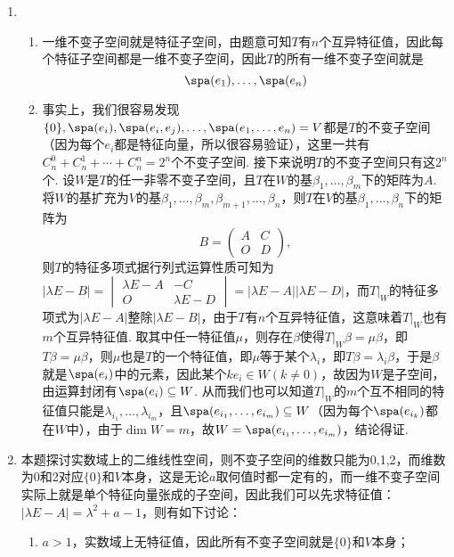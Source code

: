 \begin{enumerate}
    \item \begin{enumerate}
              \item 一维不变子空间就是特征子空间，由题意可知$T$有$n$个互异特征值，因此每个特征子空间都是一维不变子空间，因此$T$的所有一维不变子空间就是
                    \[\spa(e_1),\ldots,\spa(e_n)\]

              \item 事实上，我们很容易发现$\{0\},\spa(e_i),\spa(e_i,e_j),\ldots,\spa(e_1,\ldots,e_n)=V$都是$T$的不变子空间（因为每个$e_i$都是特征向量，所以很容易验证），这里一共有$C_n^0+C_n^1+\cdots+C_n^n=2^n$个不变子空间. 接下来说明$T$的不变子空间只有这$2^n$个. 设$W$是$T$的任一非零不变子空间，且$T$在$W$的基$\beta_1,\ldots,\beta_m$下的矩阵为$A$. 将$W$的基扩充为$V$的基$\beta_1,\ldots,\beta_m,\beta_{m+1},\ldots,\beta_n$，则$T$在$V$的基$\beta_1,\ldots,\beta_n$下的矩阵为
                    \[B=\begin{pmatrix}
                            A & C \\ O & D
                        \end{pmatrix},\]
                    则$T$的特征多项式据行列式运算性质可知为$|\lambda E-B|=\begin{vmatrix}
                            \lambda E-A & -C \\ O & \lambda E-D
                        \end{vmatrix}=|\lambda E-A||\lambda E-D|$，而$T\vert_W$的特征多项式为$|\lambda E-A|$整除$|\lambda E-B|$，由于$T$有$n$个互异特征值，这意味着$T\vert_W$也有$m$个互异特征值. 取其中任一特征值$\mu$，则存在$\beta$使得$T\vert_W\beta=\mu\beta$，即$T\beta=\mu\beta$，则$\mu$也是$T$的一个特征值，即$\mu$等于某个$\lambda_i$，即$T\beta=\lambda_i\beta$，于是$\beta$就是$\spa(e_i)$中的元素，因此某个$ke_i\in W(k\neq 0)$，故因为$W$是子空间，由运算封闭有$\spa(e_i)\subseteq W$. 从而我们也可以知道$T\vert_W$的$m$个互不相同的特征值只能是$\lambda_{i_1},\ldots,\lambda_{i_m}$，且$\spa(e_{i_1},\ldots,e_{i_m})\subseteq W$（因为每个$\spa(e_{i_k})$都在$W$中），由于$\dim W=m$，故$W=\spa(e_{i_1},\ldots,e_{i_m})$，结论得证.
          \end{enumerate}

    \item 本题探讨实数域上的二维线性空间，则不变子空间的维数只能为0,1,2，而维数为0和2对应$\{0\}$和$V$本身，这是无论$a$取何值时都一定有的，而一维不变子空间实际上就是单个特征向量张成的子空间，因此我们可以先求特征值：$|\lambda E-A|=\lambda^2+a-1$，则有如下讨论：
          \begin{enumerate}
              \item $a>1$，实数域上无特征值，因此所有不变子空间就是$\{0\}$和$V$本身；


\end{enumerate}
\end{enumerate}
